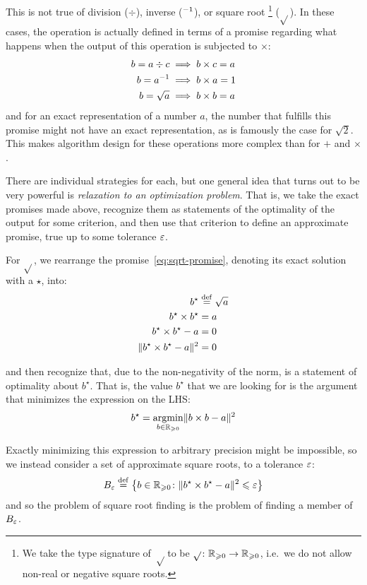 \documentclass[../../thesis.tex]{subfiles}
\begin{document}
This is not true of division ($\div$), inverse ($^{-1}$), or square root%
\footnote{We take the type signature of $\sqrt$ to be
$\sqrt{}\colon\mathbb{R}_{\geqslant 0}\to\mathbb{R}_{\geqslant 0}$,
i.e.~we do not allow non-real or negative square roots.}
($\sqrt{}$).
In these cases, the operation is actually defined in terms of a promise regarding what happens
when the output of this operation is subjected to $\times$:
\begin{align}
    b = a \div c &\implies b \times c = a\equationlabel{div-promise}\\
    b = a^{-1} &\implies b \times a = 1\equationlabel{inv-promise} \\
    b = \sqrt{a} &\implies b \times b = a\equationlabel{sqrt-promise}
\end{align}
\noindent and for an exact representation of a number $a$,
the number that fulfills this promise might not have an exact representation,
as is famously the case for $\sqrt{2}$.
This makes algorithm design for these operations more complex than for $+$ and $\times$.

There are individual strategies for each,
but one general idea that turns out to be very powerful is
\emph{relaxation to an optimization problem}.
That is, we take the exact promises made above,
recognize them as statements of the optimality of the output for some criterion,
and then use that criterion to define an approximate promise,
true up to some tolerance $\varepsilon$.

For $\sqrt{}$, we rearrange the promise~\ref{eq:sqrt-promise},
denoting its exact solution with a $\star$, into:
\begin{align}
    b^\star &\defeq \sqrt{a} \\
    b^\star \times b^\star &= a  \\
    b^\star \times b^\star - a &= 0  \\
    \snorm{b^\star \times b^\star - a} &=0\equationlabel{sqrt-opt-criter}
\end{align}

\noindent and then recognize that, due to the non-negativity of the norm,
 is a statement of optimality about $b^\star$.
That is,
the value $b^\star$ that we are looking for is the
argument that minimizes the expression on the LHS:\@
\begin{equation}
	b^\star = \mathop{\mathrm{argmin}}_{b \in \mathbb{R}_{\geqslant 0}} \lVert b \times b - a\rVert^2
\end{equation}

Exactly minimizing this expression to arbitrary precision
might be impossible,
so we instead consider a set of approximate square roots,
to a tolerance $\varepsilon$:
\begin{equation}\equationlabel{sqrteps}
	B_\eps \defeq
	\Set{b \in \R_{\geq 0} \suchthat \snorm{b^\star \times b^\star - a} \leq \eps }
\end{equation}
\noindent and so the problem of square root finding
is the problem of finding a member of $B_\varepsilon$.
\end{document}
